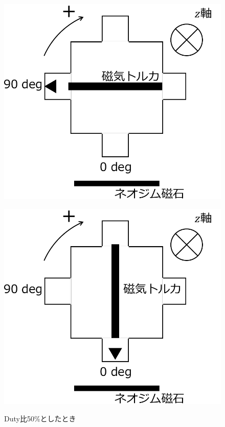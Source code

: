 \begin{figure}[h]
	\centering
	\begin{minipage}{0.3\columnwidth}
	  \centering
	  \includegraphics[width=\columnwidth]{./figure/90deg-crop.pdf}
	  \label{fig:90deg}
	\end{minipage}
	\hspace{5mm}
	\begin{minipage}{0.3\columnwidth}
	  \centering
	  \includegraphics[width=\columnwidth]{./figure/0deg-crop.pdf}
	  \label{fig:0deg}
	\end{minipage}
	\caption{Duty比50\%としたとき}
	\label{fig:method}
  \end{figure}

